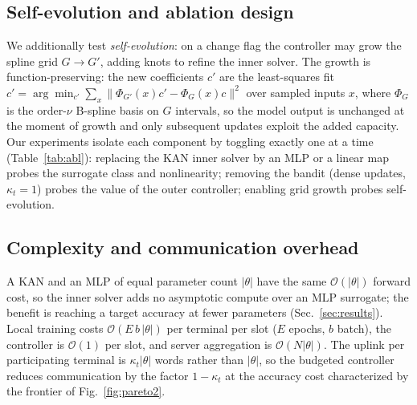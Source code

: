 \documentclass[journal]{IEEEtran}
\begin{document}
\subsection{Self-evolution and ablation design}\label{sec:ablation}
We additionally test \emph{self-evolution}: on a change flag the controller may grow
the spline grid $G\!\to\!G'$, adding knots to refine the inner solver. The growth is
function-preserving: the new coefficients $c'$ are the least-squares fit
$c'=\arg\min_{c'}\sum_x\|\Phi_{G'}(x)c'-\Phi_{G}(x)c\|^2$ over sampled inputs $x$,
where $\Phi_G$ is the order-$\nu$ B-spline basis on $G$ intervals, so the model
output is unchanged at the moment of growth and only subsequent updates exploit the
added capacity. Our experiments isolate
each component by toggling exactly one at a time (Table~\ref{tab:abl}): replacing
the KAN inner solver by an MLP or a linear map probes the surrogate class and
nonlinearity; removing the bandit (dense updates, $\kappa_t\!=\!1$) probes the value
of the outer controller; enabling grid growth probes self-evolution.

\begin{table}[t]
\caption{Ablation design: each variant changes one component of (P1).}
\label{tab:abl}
\centering
\footnotesize
{}
\end{table}

\subsection{Complexity and communication overhead}
A KAN and an MLP of equal parameter count $|\theta|$ have the same
$\mathcal O(|\theta|)$ forward cost, so the inner solver adds no asymptotic compute
over an MLP surrogate; the benefit is reaching a target accuracy at fewer
parameters (Sec.~\ref{sec:results}). Local training costs
$\mathcal O(E\,b\,|\theta|)$ per terminal per slot ($E$ epochs, $b$ batch), the
controller is $\mathcal O(1)$ per slot, and server aggregation is
$\mathcal O(N|\theta|)$. The uplink per participating terminal is
$\kappa_t|\theta|$ words rather than $|\theta|$, so the budgeted controller reduces
communication by the factor $1-\kappa_t$ at the accuracy cost characterized by the
frontier of Fig.~\ref{fig:pareto2}.
\end{document}
